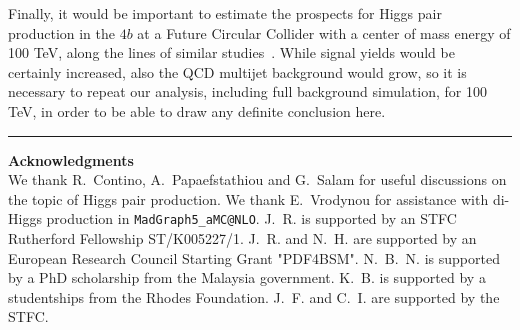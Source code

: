 Finally, it would be important to estimate the prospects for
Higgs pair production in the $4b$ at a Future Circular
Collider with a center of mass energy of 100 TeV, along the lines
of similar studies~\cite{Barr:2014sga}.
%
While signal yields would be certainly increased, also the QCD
multijet background would grow, so it is necessary to repeat
our analysis, including full background simulation, for 100 TeV,
in order to be able to draw any definite conclusion here.



\bigskip
\bigskip
\begin{center}
\rule{5cm}{.1pt}
\end{center}
\bigskip
\bigskip

{\bf\noindent  Acknowledgments \\}
We thank R.~Contino, A.~Papaefstathiou and
G.~Salam for useful discussions on the topic
of Higgs pair production.
%
We thank E.~Vrodynou for assistance with di-Higgs production
  in {\tt MadGraph5\_aMC@NLO}.
%
J.~R. is supported by an STFC Rutherford Fellowship ST/K005227/1.
%
J.~R. and N.~H. are
supported by an European Research Council Starting Grant "PDF4BSM".
%
N.~B.~N. is supported by a PhD scholarship from the Malaysia
government.
K.~B. is supported by a studentships from the Rhodes Foundation.
%
J.~F. and C.~I. are supported by the STFC.
